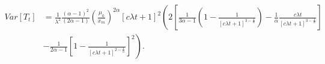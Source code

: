 \documentclass{article}
\numberwithin{equation}{section}
\begin{document}
	
	
	
	\begin{align*}Var[T_t]&=\frac{1}{\lambda^2}\frac{(\alpha-1)^2}{(2\alpha-1)}\left(\frac{\mu_0}{x_m} \right)^{2\alpha} [c\lambda t+1]^2\left(2 \left[\frac{1}{3\alpha-1}\left(1-\frac{1}{\left[c\lambda t+1 \right]^{3-\frac{1}{\alpha}}}\right)-\frac{1}{\alpha}\frac{c\lambda t}{\left[c\lambda t+1 \right]^{3-\frac{1}{\alpha}}} \right]\right.\\
&\left.	-\frac{1}{2\alpha-1}\left[1-\frac{1}{\left[c \lambda t+1\right]^{2-\frac{1}{\alpha}}} \right]^2\right).
\end{align*}






\end{document}
